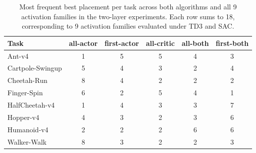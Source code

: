 \begin{table}[!htbp]
\centering
\caption{Most frequent best placement per task across both algorithms and all 9 activation families in the two-layer experiments. Each row sums to 18, corresponding to 9 activation families evaluated under TD3 and SAC.}
\label{tab:placement-by-task-all}
\small
\setlength{\tabcolsep}{5pt}
\renewcommand{\arraystretch}{1.08}
\begin{tabular}{lccccc}
\toprule
Task & all-actor & first-actor & all-critic & all-both & first-both \\
\midrule
Ant-v4 & 1 & 5 & 5 & 4 & 3 \\
Cartpole-Swingup & 5 & 4 & 3 & 2 & 4 \\
Cheetah-Run & 8 & 4 & 2 & 2 & 2 \\
Finger-Spin & 6 & 2 & 5 & 4 & 1 \\
HalfCheetah-v4 & 1 & 4 & 3 & 3 & 7 \\
Hopper-v4 & 4 & 3 & 2 & 3 & 6 \\
Humanoid-v4 & 2 & 2 & 2 & 6 & 6 \\
Walker-Walk & 8 & 3 & 2 & 2 & 3 \\
\bottomrule
\end{tabular}
\end{table}
